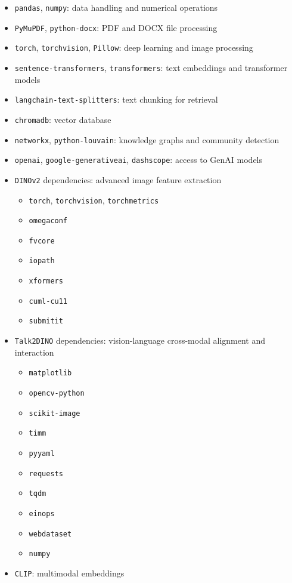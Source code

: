 \begin{itemize}
    \item \texttt{pandas}, \texttt{numpy}: data handling and numerical operations
    \item \texttt{PyMuPDF}, \texttt{python-docx}: PDF and DOCX file processing
    \item \texttt{torch}, \texttt{torchvision}, \texttt{Pillow}: deep learning and image processing
    \item \texttt{sentence-transformers}, \texttt{transformers}: text embeddings and transformer models
    \item \texttt{langchain-text-splitters}: text chunking for retrieval
    \item \texttt{chromadb}: vector database
    \item \texttt{networkx}, \texttt{python-louvain}: knowledge graphs and community detection
    \item \texttt{openai}, \texttt{google-generativeai}, \texttt{dashscope}: access to GenAI models
    \item \texttt{DINOv2} dependencies: advanced image feature extraction
            \begin{itemize}
                \item \texttt{torch}, \texttt{torchvision}, \texttt{torchmetrics}
                \item \texttt{omegaconf}
                \item \texttt{fvcore}
                \item \texttt{iopath}
                \item \texttt{xformers}
                \item \texttt{cuml-cu11}
                \item \texttt{submitit}
            \end{itemize}
    \item \texttt{Talk2DINO} dependencies: vision-language cross-modal alignment and interaction
            \begin{itemize}
                \item \texttt{matplotlib}
                \item \texttt{opencv-python}
                \item \texttt{scikit-image}
                \item \texttt{timm}
                \item \texttt{pyyaml}
                \item \texttt{requests}
                \item \texttt{tqdm}
                \item \texttt{einops}
                \item \texttt{webdataset}
                \item \texttt{numpy}
            \end{itemize}
    \item \texttt{CLIP}: multimodal embeddings
\end{itemize}